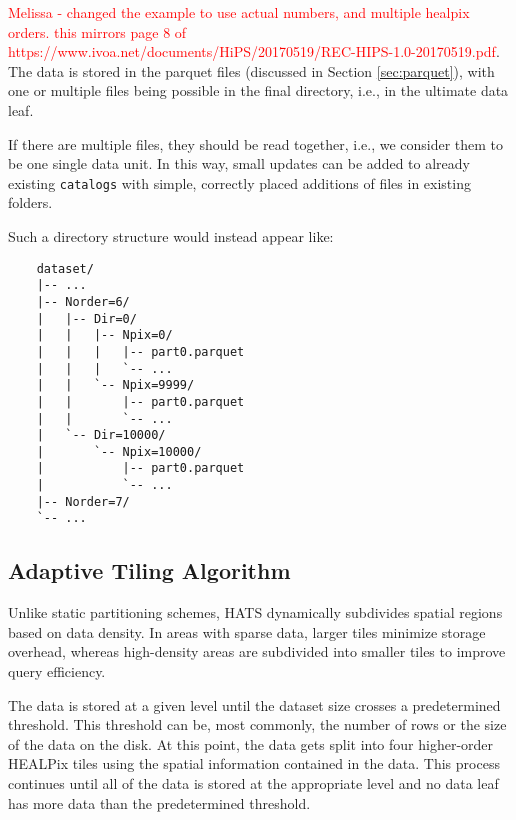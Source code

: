\documentclass[11pt,a4paper]{ivoa}
\begin{document}
\textcolor{red}{Melissa - changed the example to use actual numbers, and multiple healpix orders. this mirrors page 8 of https://www.ivoa.net/documents/HiPS/20170519/REC-HIPS-1.0-20170519.pdf}. 
The data is stored in the parquet files (discussed in Section \ref{sec:parquet}), with one or multiple files being possible in the final directory, i.e., in the ultimate data leaf.  \par 
If there are multiple files, they should be read together, i.e., we consider them to be one single data unit. 
In this way, small updates can be added to already existing  \texttt{catalogs} with simple, correctly placed additions of files in existing folders.

Such a directory structure would instead appear like:
\begin{verbatim}
    dataset/
    |-- ...
    |-- Norder=6/
    |   |-- Dir=0/
    |   |   |-- Npix=0/
    |   |   |   |-- part0.parquet
    |   |   |   `-- ...
    |   |   `-- Npix=9999/
    |   |       |-- part0.parquet
    |   |       `-- ...
    |   `-- Dir=10000/
    |       `-- Npix=10000/
    |           |-- part0.parquet
    |           `-- ...
    |-- Norder=7/
    `-- ...
\end{verbatim} 

    \subsection{Adaptive Tiling Algorithm} \label{sec:adaptive}
    Unlike static partitioning schemes, HATS dynamically subdivides spatial regions based on data density. In areas with sparse data, larger tiles minimize storage overhead, whereas high-density areas are subdivided into smaller tiles to improve query efficiency. \par
	The data is stored at a given level until the dataset size crosses a predetermined threshold. This threshold can be, most commonly, the number of rows or the size of the data on the disk. At this point, the data gets split into four higher-order HEALPix tiles using the spatial information contained in the data. This process continues until all of the data is stored at the appropriate level and no data leaf has more data than the predetermined threshold.
\end{document}
